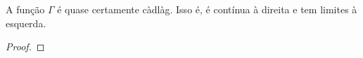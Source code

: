 \begin{proposicao}
  \label{prop:gamma-cadlag}
  A função $\Gamma$ é quase certamente càdlàg. Isso é, é contínua à
  direita e tem limites à esquerda.
\end{proposicao}
\begin{proof}












\end{proof}

